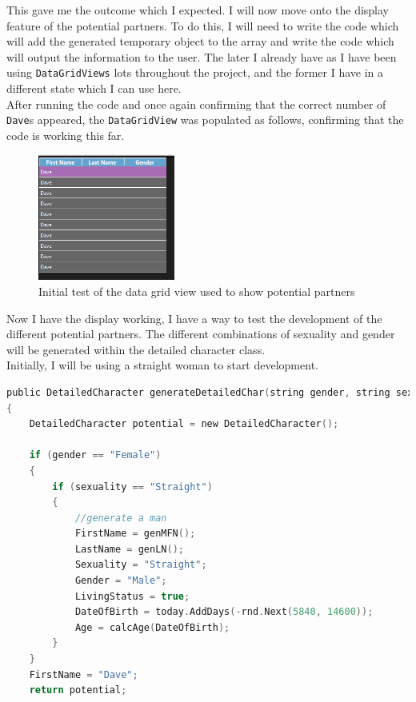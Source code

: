 \noindent This gave me the outcome which I expected. I will now move onto the display feature of the potential partners.
To do this, I will need to write the code which will add the generated temporary object to the array and write the code which will output the information to the user. The later I already have as I have been using \verb|DataGridViews| lots throughout the project, and the former I have in a different state which I can use here.\\
After running the code and once again confirming that the correct number of \verb|Dave|s appeared, the \verb|DataGridView| was populated as follows, confirming that the code is working this far.
\begin{figure}[H]
    \centering
    \includegraphics[width=0.4\textwidth]{images/implementation/partners2.png}
    \caption{Initial test of the data grid view used to show potential partners}
    \label{fig:implementation-partners2}
\end{figure}
Now I have the display working, I have a way to test the development of the different potential partners. The different combinations of sexuality and gender will be generated within the detailed character class.\\
Initially, I will be using a straight woman to start development.
\begin{lstlisting}[language=c, style=csharp, caption=Code to generate potential partners for a straight woman]
public DetailedCharacter generateDetailedChar(string gender, string sexuality, DateTime today)
{
    DetailedCharacter potential = new DetailedCharacter();

    if (gender == "Female")
    {
        if (sexuality == "Straight")
        {
            //generate a man
            FirstName = genMFN();
            LastName = genLN();
            Sexuality = "Straight";
            Gender = "Male";
            LivingStatus = true;
            DateOfBirth = today.AddDays(-rnd.Next(5840, 14600));
            Age = calcAge(DateOfBirth);
        }
    }
    FirstName = "Dave";
    return potential;
\end{lstlisting}
